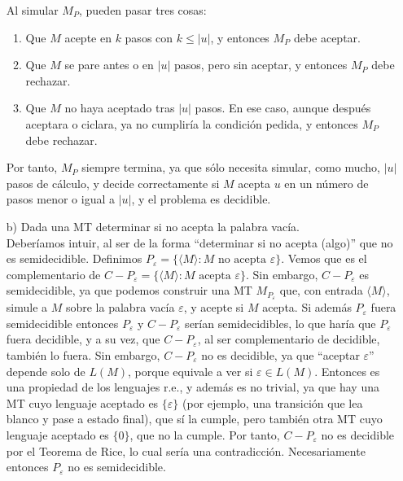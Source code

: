 \begin{ejercicio}
\begin{itemize}
        Al simular $M_P$, pueden pasar tres cosas:

        \begin{enumerate}
            \item Que $M$ acepte en $k$ pasos con $k \le |u|$, y entonces $M_P$ debe aceptar.

            \item Que $M$ se pare antes o en $|u|$ pasos, pero sin aceptar, y entonces $M_P$ debe rechazar.

            \item Que $M$ no haya aceptado tras $|u|$ pasos. En ese caso, aunque después aceptara o ciclara, ya no cumpliría la condición pedida, y entonces $M_P$ debe rechazar.
        \end{enumerate}

        Por tanto, $M_P$ siempre termina, ya que sólo necesita simular, como mucho, $|u|$ pasos de cálculo, y decide correctamente si $M$ acepta $u$ en un número de pasos menor o igual a $|u|$,
        y el problema es decidible.

        

        \item[b)] Dada una MT determinar si no acepta la palabra vacía.\\
        
        Deberíamos intuir, al ser de la forma ``determinar si no acepta (algo)'' que no es semidecidible. Definimos $P_\varepsilon = \{\langle M \rangle : M \text{ no acepta } \varepsilon\}$. Vemos que es el complementario
        de $C-P_\varepsilon = \{\langle M \rangle : M \text{ acepta } \varepsilon\}$. Sin embargo, $C-P_\varepsilon$ es 
        semidecidible, ya que podemos construir una MT $M_{P_\varepsilon}$ que, con entrada $\langle M \rangle$, 
        simule a $M$ sobre la palabra vacía $\varepsilon$, y acepte si $M$ acepta. Si además $P_\varepsilon$ fuera
        semidecidible entonces $P_\varepsilon$ y $C-P_\varepsilon$ serían semidecidibles, lo que haría que 
        $P_\varepsilon$ fuera decidible, y a su vez, que $C-P_\varepsilon$, al ser complementario de decidible, también lo fuera.
        Sin embargo, $C-P_\varepsilon$ no es decidible, ya que ``aceptar $\varepsilon$'' depende solo de $L(M)$, porque
        equivale a ver si $\varepsilon \in L(M)$. Entonces es una propiedad de los lenguajes r.e., y además es no trivial, 
        ya que hay una MT cuyo lenguaje aceptado es $\{\varepsilon\}$ (por ejemplo, una transición que lea blanco y pase a estado final), que sí la cumple, 
        pero también otra MT cuyo lenguaje aceptado es $\{0\}$, que no la cumple. Por tanto, $C-P_\varepsilon$
        no es decidible por el Teorema de Rice, lo cual sería una contradicción. Necesariamente entonces $P_\varepsilon$ no es semidecidible.
    \end{itemize}
\end{ejercicio}



